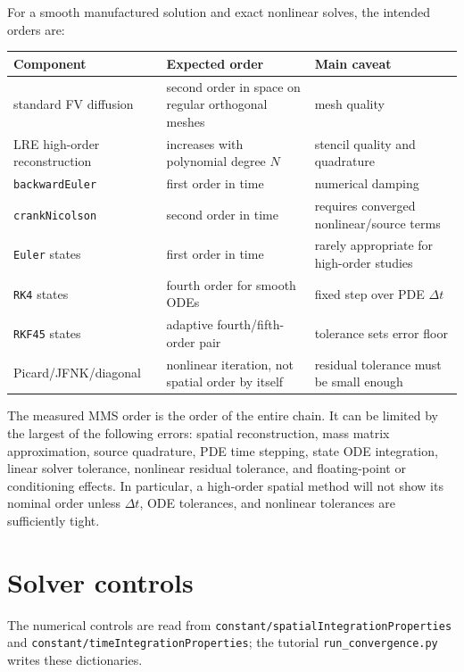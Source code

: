 \documentclass[11pt,a4paper]{article}
\newcommand{\code}[1]{\texttt{\small #1}}
\begin{document}
For a smooth manufactured solution and exact nonlinear solves, the intended
orders are:
\begin{center}
\scriptsize
\begin{tabular}{@{}lll@{}}
Component & Expected order & Main caveat \\
\midrule
standard FV diffusion & second order in space on regular orthogonal meshes & mesh quality \\
LRE high-order reconstruction & increases with polynomial degree $N$ & stencil quality and quadrature \\
\code{backwardEuler} & first order in time & numerical damping \\
\code{crankNicolson} & second order in time & requires converged nonlinear/source terms \\
\code{Euler} states & first order in time & rarely appropriate for high-order studies \\
\code{RK4} states & fourth order for smooth ODEs & fixed step over PDE $\Delta t$ \\
\code{RKF45} states & adaptive fourth/fifth-order pair & tolerance sets error floor \\
Picard/JFNK/diagonal & nonlinear iteration, not spatial order by itself & residual tolerance must be small enough \\
\bottomrule
\end{tabular}
\end{center}
The measured MMS order is the order of the entire chain. It can be limited by
the largest of the following errors: spatial reconstruction, mass matrix
approximation, source quadrature, PDE time stepping, state ODE integration,
linear solver tolerance, nonlinear residual tolerance, and floating-point or
conditioning effects. In particular, a high-order spatial method will not show
its nominal order unless $\Delta t$, ODE tolerances, and nonlinear tolerances
are sufficiently tight.

\section{Solver controls}

The numerical controls are read from
\code{constant/spatialIntegrationProperties} and
\code{constant/timeIntegrationProperties}; the tutorial
\code{run\_convergence.py} writes these dictionaries.
\end{document}
